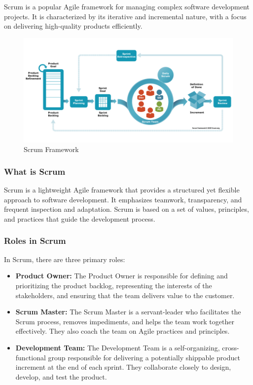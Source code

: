 Scrum is a popular Agile framework for managing complex software development
projects. It is characterized by its iterative and incremental nature, with a
focus on delivering high-quality products efficiently.

\begin{figure}
      \centering
      \includegraphics[width=1\textwidth]{../images/scrum.png}
      \caption{Scrum Framework}
      \label{fig:Scrum Framework}
\end{figure}

\subsubsection{What is Scrum}

Scrum is a lightweight Agile framework that provides a structured yet flexible
approach to software development. It emphasizes teamwork, transparency, and
frequent inspection and adaptation. Scrum is based on a set of values,
principles, and practices that guide the development process.

\subsubsection{Roles in Scrum}

In Scrum, there are three primary roles:

\begin{itemize}[label=]
      \item \textbf{Product Owner:} The Product Owner is responsible for
            defining and prioritizing the product backlog, representing the
            interests of
            the stakeholders, and ensuring that the team delivers value to
            the customer.
      \item \textbf{Scrum Master:} The Scrum Master is a servant-leader who
            facilitates the Scrum process, removes impediments, and helps the
            team work
            together effectively. They also coach the team on Agile practices
            and
            principles.
      \item \textbf{Development Team:} The Development Team is a
            self-organizing, cross-functional group responsible for
            delivering a
            potentially shippable product increment at the end of each
            sprint. They
            collaborate closely to design, develop, and test the product.
\end{itemize}

